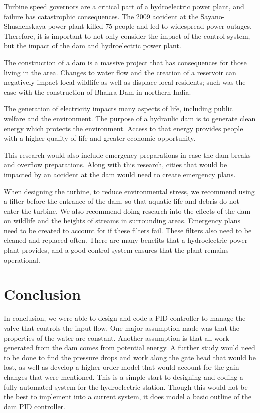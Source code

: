 \documentclass{article}
\begin{document}
\begin{multicols*}{2}
        Turbine speed governors are a critical part of a hydroelectric power plant, and failure has catastrophic consequences. The 2009 accident at the Sayano-Shushenskaya power plant killed 75 people and led to widespread power outages. Therefore, it is important to not only consider the impact of the control system, but the impact of the dam and hydroelectric power plant.

        The construction of a dam is a massive project that has consequences for those living in the area. Changes to water flow and the creation of a reservoir can negatively impact local wildlife as well as displace local residents; such was the case with the construction of Bhakra Dam in northern India. 

        The generation of electricity impacts many aspects of life, including public welfare and the environment. The purpose of a hydraulic dam is to generate clean energy which protects the environment. Access to that energy provides people with a higher quality of life and greater economic opportunity.

        This research would also include emergency preparations in case the dam breaks and overflow preparations. Along with this research, cities that would be impacted by an accident at the dam would need to create emergency plans.

        When designing the turbine, to reduce environmental stress, we recommend using a filter before the entrance of the dam, so that aquatic life and debris do not enter the turbine. We also recommend doing research into the effects of the dam on wildlife and the heights of streams in surrounding areas. Emergency plans need to be created to account for if these filters fail. These filters also need to be cleaned and replaced often.
        There are many benefits that a hydroelectric power plant provides, and a good control system ensures that the plant remains operational.

        \section{Conclusion}

        In conclusion, we were able to design and code a PID controller to manage the valve that controls the input flow.  One major assumption made was that the properties of the water are constant.  Another assumption is that all work generated from the dam comes from potential energy.  A further study would need to be done to find the pressure drops and work along the gate head that would be lost, as well as develop a higher order model that would account for the gain changes that were mentioned. This is a simple start to designing and coding a fully automated system for the hydroelectric station.  Though this would not be the best to implement into a current system, it does model a basic outline of the dam PID controller.


    \end{multicols*}
    \pagebreak
    \nocite{*}
    \printbibliography
\end{document}
